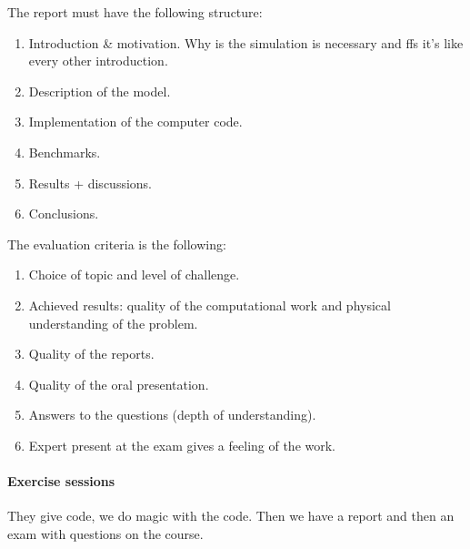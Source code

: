 \documentclass[palatino]{epflnotes}
\begin{document}
The report must have the following structure:

\begin{enumerate}
\item Introduction \& motivation. Why is the simulation is necessary and ffs it's like every other introduction.
\item Description of the model.
\item Implementation of the computer code.
\item Benchmarks.
\item Results + discussions.
\item Conclusions.
\end{enumerate}

The evaluation criteria is the following:

\begin{enumerate}
\item Choice of topic and level of challenge.
\item Achieved results: quality of the computational work and physical understanding of the problem.
\item Quality of the reports.
\item Quality of the oral presentation.
\item Answers to the questions (depth of understanding).
\item Expert present at the exam gives a feeling of the work.
\end{enumerate}

\paragraph{Exercise sessions} They give code, we do magic with the code. Then we have a report and then an exam with questions on the course.

%

\backmatter
\printindex
\end{document}
